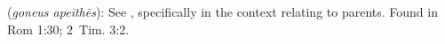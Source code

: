 \item[Disobedient to parents,]

(\textit{goneus apeithēs}):
See , specifically in the context relating to parents.
Found in Rom 1:30; 2~Tim. 3:2.
